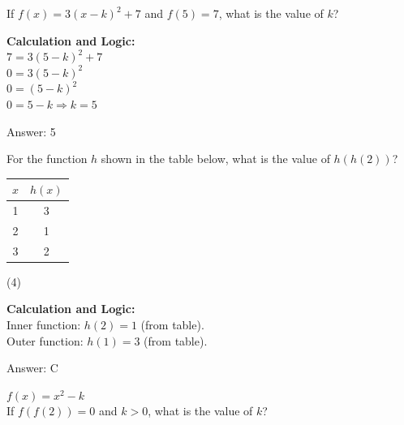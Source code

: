 \documentclass[11pt,paper=a4,answers]{exam}
\begin{document}
\begin{questions}
\question
If $f(x) = 3(x-k)^2 + 7$ and $f(5) = 7$, what is the value of $k$?

\begin{solution}
\textbf{Calculation and Logic:} \\
$7 = 3(5-k)^2 + 7$ \\
$0 = 3(5-k)^2$ \\
$0 = (5-k)^2$ \\
$0 = 5-k \Rightarrow k = 5$

\vspace{30pt}

Answer: \colorbox{yellow!100}{5}
\end{solution}

\vspace{40pt}

\question
For the function $h$ shown in the table below, what is the value of $h(h(2))$?
\begin{center}
\begin{tabular}{|c|c|} \hline $x$ & $h(x)$ \\ \hline 1 & 3 \\ \hline 2 & 1 \\ \hline 3 & 2 \\ \hline \end{tabular}
\end{center}
\begin{tasks}(4)
\end{tasks}

\begin{solution}
\textbf{Calculation and Logic:} \\
Inner function: $h(2) = 1$ (from table). \\
Outer function: $h(1) = 3$ (from table).

\vspace{30pt}

Answer: \colorbox{yellow!100}{C}
\end{solution}

\vspace{40pt}

\question
$f(x) = x^2 - k$ \\
If $f(f(2)) = 0$ and $k > 0$, what is the value of $k$?


\end{questions}
\end{document}
